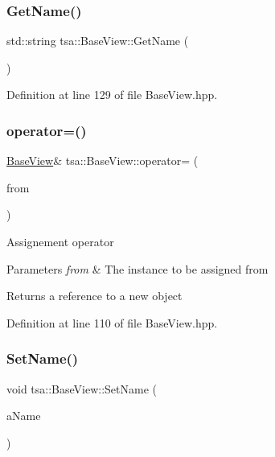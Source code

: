\subsubsection{\texorpdfstring{Get\+Name()}{GetName()}}
{\footnotesize\ttfamily std\+::string tsa\+::\+Base\+View\+::\+Get\+Name (\begin{DoxyParamCaption}{ }\end{DoxyParamCaption})\hspace{0.3cm}{\ttfamily [inline]}}



Definition at line 129 of file Base\+View.\+hpp.

\mbox{\label{classtsa_1_1_base_view_a29e213aae81ad55e146a5e41ad5a1ce9}} 
\subsubsection{\texorpdfstring{operator=()}{operator=()}}
{\footnotesize\ttfamily \hyperlink{classtsa_1_1_base_view}{Base\+View}\& tsa\+::\+Base\+View\+::operator= (\begin{DoxyParamCaption}\item[{const \hyperlink{classtsa_1_1_base_view}{Base\+View} \&}]{from }\end{DoxyParamCaption})\hspace{0.3cm}{\ttfamily [inline]}}

Assignement operator


\begin{DoxyParams}{Parameters}
{\em from} & The instance to be assigned from\\
\hline
\end{DoxyParams}
\begin{DoxyReturn}{Returns}
a reference to a new object 
\end{DoxyReturn}


Definition at line 110 of file Base\+View.\+hpp.

\mbox{\label{classtsa_1_1_base_view_abcfce2c227a5826093e7cb86a02765f9}} 
\subsubsection{\texorpdfstring{Set\+Name()}{SetName()}}
{\footnotesize\ttfamily void tsa\+::\+Base\+View\+::\+Set\+Name (\begin{DoxyParamCaption}\item[{const std\+::string \&}]{a\+Name }\end{DoxyParamCaption})\hspace{0.3cm}{\ttfamily [inline]}}



